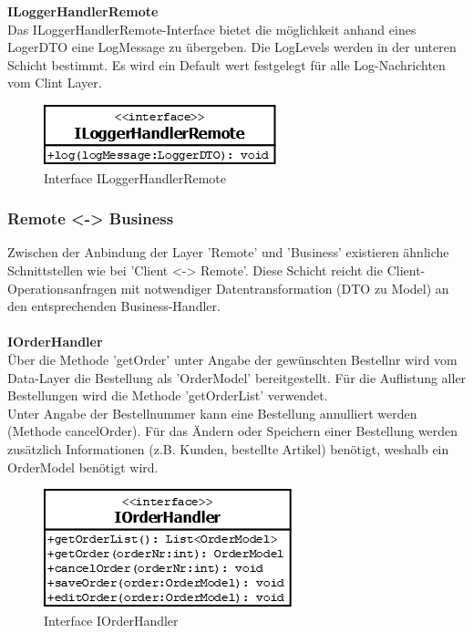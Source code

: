 \textbf{ILoggerHandlerRemote}\\
Das ILoggerHandlerRemote-Interface bietet die möglichkeit anhand eines LogerDTO eine LogMessage zu übergeben. Die LogLevels werden in der unteren Schicht bestimmt. Es wird ein Default wert festgelegt für alle Log-Nachrichten vom Clint Layer.
\begin{figure}[H]
	\includegraphics[width=0.5\linewidth]{Images/ILoggerHandlerRemote}
	\caption{Interface ILoggerHandlerRemote}
	\label{fig:if-ILoggerHandlerRemote}
\end{figure}







\subsubsection{Remote <-> Business}
Zwischen der Anbindung der Layer 'Remote' und 'Business' existieren ähnliche Schnittstellen wie bei 'Client <-> Remote'. Diese Schicht reicht die Client-Operationsanfragen mit notwendiger Datentransformation (DTO zu Model) an den entsprechenden Business-Handler.\\\\


\textbf{IOrderHandler}\\
Über die Methode 'getOrder' unter Angabe der gewünschten Bestellnr wird vom Data-Layer die Bestellung als 'OrderModel' bereitgestellt. Für die Auflistung aller Bestellungen wird die Methode 'getOrderList' verwendet.\\
Unter Angabe der Bestellnummer kann eine Bestellung annulliert werden (Methode cancelOrder). Für das Ändern oder Speichern einer Bestellung werden zusätzlich Informationen (z.B. Kunden, bestellte Artikel) benötigt, weshalb ein OrderModel benötigt wird. 
\begin{figure}[H]
	\includegraphics[width=0.3\linewidth]{Images/IOrderHandler}
	\caption{Interface IOrderHandler}
	\label{fig:if-IOrderHandler}
\end{figure}



